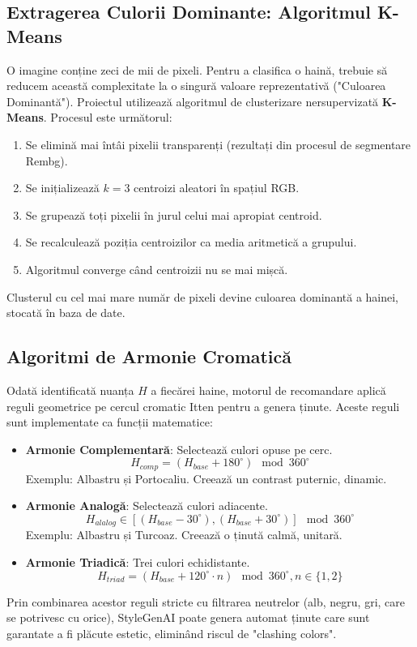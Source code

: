 \subsection{Extragerea Culorii Dominante: Algoritmul K-Means}
O imagine conține zeci de mii de pixeli. Pentru a clasifica o haină, trebuie să reducem această complexitate la o singură valoare reprezentativă ("Culoarea Dominantă").
Proiectul utilizează algoritmul de clusterizare nersupervizată \textbf{K-Means}. Procesul este următorul:
\begin{enumerate}
    \item Se elimină mai întâi pixelii transparenți (rezultați din procesul de segmentare Rembg).
    \item Se inițializează $k=3$ centroizi aleatori în spațiul RGB.
    \item Se grupează toți pixelii în jurul celui mai apropiat centroid.
    \item Se recalculează poziția centroizilor ca media aritmetică a grupului.
    \item Algoritmul converge când centroizii nu se mai mișcă.
\end{enumerate}
Clusterul cu cel mai mare număr de pixeli devine culoarea dominantă a hainei, stocată în baza de date.

\subsection{Algoritmi de Armonie Cromatică}
Odată identificată nuanța $H$ a fiecărei haine, motorul de recomandare aplică reguli geometrice pe cercul cromatic Itten pentru a genera ținute. Aceste reguli sunt implementate ca funcții matematice:

\begin{itemize}
    \item \textbf{Armonie Complementară}: Selectează culori opuse pe cerc.
    \begin{equation}
    H_{comp} = (H_{base} + 180^{\circ}) \mod 360^{\circ}
    \end{equation}
    Exemplu: Albastru și Portocaliu. Creează un contrast puternic, dinamic.
    
    \item \textbf{Armonie Analogă}: Selectează culori adiacente.
    \begin{equation}
    H_{alalog} \in [(H_{base} - 30^{\circ}), (H_{base} + 30^{\circ})] \mod 360^{\circ}
    \end{equation}
    Exemplu: Albastru și Turcoaz. Creează o ținută calmă, unitară.
    
    \item \textbf{Armonie Triadică}: Trei culori echidistante.
    \begin{equation}
    H_{triad} = (H_{base} + 120^{\circ} \cdot n) \mod 360^{\circ}, n \in \{1, 2\}
    \end{equation}
\end{itemize}

Prin combinarea acestor reguli stricte cu filtrarea neutrelor (alb, negru, gri, care se potrivesc cu orice), StyleGenAI poate genera automat ținute care sunt garantate a fi plăcute estetic, eliminând riscul de "clashing colors".
